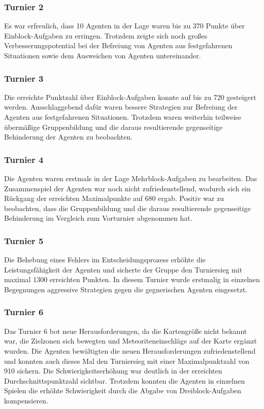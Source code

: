 \documentclass[runningheads]{llncs}
\begin{document}
	\subsubsection{Turnier 2}
	Es war erfreulich, dass 10 Agenten in der Lage waren bis zu 370 Punkte über Einblock-Aufgaben zu erringen. Trotzdem zeigte sich noch großes Verbesserungspotential bei der Befreiung von Agenten aus festgefahrenen Situationen sowie dem Ausweichen von Agenten untereinander.
	
	\subsubsection{Turnier 3}
	Die erreichte Punktzahl über Einblock-Aufgaben konnte auf bis zu 720 gesteigert werden. Ausschlaggebend dafür waren bessere Strategien zur Befreiung der Agenten aus festgefahrenen Situationen. Trotzdem waren weiterhin teilweise übermäßige Gruppenbildung und die daraus resultierende gegenseitige Behinderung der Agenten zu beobachten.
	
	\subsubsection{Turnier 4}
	Die Agenten waren erstmals in der Lage Mehrblock-Aufgaben zu bearbeiten. Das Zusammenspiel der Agenten war noch nicht zufriedenstellend, wodurch sich ein Rückgang der erreichten Maximalpunkte auf 680 ergab. Positiv war zu beobachten, dass die Gruppenbildung und die daraus resultierende gegenseitige Behinderung im Vergleich zum Vorturnier abgenommen hat.
	
	\subsubsection{Turnier 5}
	Die Behebung eines Fehlers im Entscheidungsprozess erhöhte die Leistungsfähigkeit der Agenten und sicherte der Gruppe den Turniersieg mit maximal 1300 erreichten Punkten. In diesem Turnier wurde erstmalig in einzelnen Begegnungen aggressive Strategien gegen die gegnerischen Agenten eingesetzt.
	
	\subsubsection{Turnier 6}
	Das Turnier 6 bot neue Herausforderungen, da die Kartengröße nicht bekannt war, die Zielzonen sich bewegten und Meteoriteneinschläge auf der Karte ergänzt wurden. Die Agenten bewältigten die neuen Herausforderungen zufriedenstellend und konnten auch dieses Mal den Turniersieg mit einer Maximalpunktzahl von 910 sichern. Die Schwierigkeitserhöhung war deutlich in der erreichten Durchschnittspunktzahl sichtbar. Trotzdem konnten die Agenten in einzelnen Spielen die erhöhte Schwierigkeit durch die Abgabe von Dreiblock-Aufgaben kompensieren.
	
\end{document}
